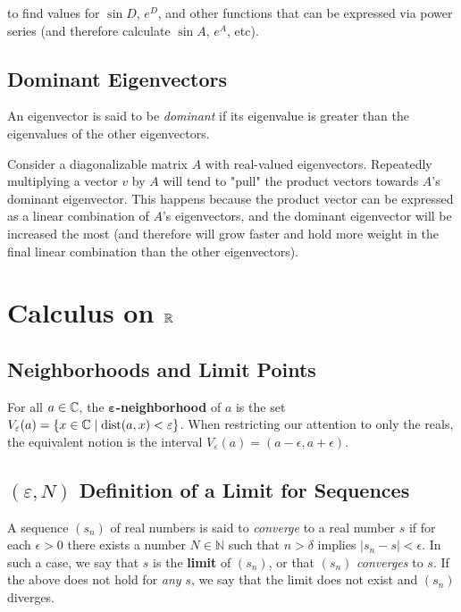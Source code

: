 to find values for $\sin{D}$, $e^{D}$, and other functions that can be expressed via power series (and therefore calculate $\sin{A}$, $e^{A}$, etc).

\subsection{Dominant Eigenvectors}


An eigenvector is said to be \textit{dominant} if its eigenvalue is greater than the eigenvalues of the other eigenvectors.

Consider a diagonalizable matrix $A$ with real-valued eigenvectors. Repeatedly multiplying a vector $v$ by $A$ will tend to "pull" the product vectors towards $A$'s dominant eigenvector. This happens because the product vector can be expressed as a linear combination of $A$'s eigenvectors, and the dominant eigenvector will be increased the most (and therefore will grow faster and hold more weight in the final linear combination than the other eigenvectors).

\pagebreak




\section{Calculus on $\mathbb{R}$}

\subsection{Neighborhoods and Limit Points}

For all $a \in \mathbb{C}$, the $\mathbf{\varepsilon}$\textbf{-neighborhood} of $a$ is the set $V_\varepsilon(a)= \left\lbrace x \in \mathbb{C} \;\middle|\; \operatorname{dist}(a, x) < \varepsilon \right\rbrace$. When restricting our attention to only the reals, the equivalent notion is the interval $V_\varepsilon(a) = (a-\epsilon, a+\epsilon)$.

\subsection{$(\varepsilon, N)$ Definition of a Limit for Sequences}

A sequence $(s_n)$ of real numbers is said to \textit{converge} to a real number $s$ if for each $\epsilon > 0$ there exists a number $N \in \mathbb{N}$ such that $n > \delta$ implies $|s_{n} - s| < \epsilon$. In such a case, we say that $s$ is the \textbf{limit} of $(s_n)$, or that $(s_n)$ \textit{converges} to $s$. If the above does not hold for \textit{any} $s$, we say that the limit does not exist and $(s_n)$ diverges.

